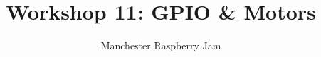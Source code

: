 \documentclass[a4paper, twocolumn, twoside, 11pt]{article}
\begin{document}
	\author{Manchester Raspberry Jam}
	\title{Workshop 11: GPIO \& Motors}
	\date{}
	\maketitle
	
	\setcounter{tocdepth}{1}
	\tableofcontents
	
	
	\newpage																						%
	
	
	
	\begin{appendices}	
		
		
		
		
	\end{appendices}	
	
\end{document}
